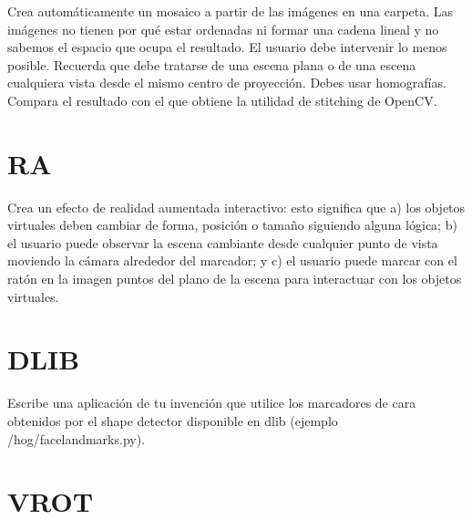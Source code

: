 \documentclass[a4paper]{article} %
\begin{document}
\begin{tcolorbox}[breakable,notitle,boxrule=0pt,colback=lightgray,colframe=lightgray]
	Crea automáticamente un mosaico a partir de las imágenes en una carpeta. Las imágenes no tienen por qué estar ordenadas ni formar una cadena lineal y no sabemos el espacio que ocupa el resultado. El usuario debe intervenir lo menos posible. Recuerda que debe tratarse de una escena plana o de una escena cualquiera vista desde el mismo centro de proyección. Debes usar homografías. Compara el resultado con el que obtiene la utilidad de stitching de OpenCV.
\end{tcolorbox}

\newpage


\section{RA}
\bigskip

\begin{tcolorbox}[breakable,notitle,boxrule=0pt,colback=lightgray,colframe=lightgray]
	Crea un efecto de realidad aumentada interactivo: esto significa que a) los objetos virtuales deben cambiar de forma, posición o tamaño siguiendo alguna lógica; b) el usuario puede observar la escena cambiante desde cualquier punto de vista moviendo la cámara alrededor del marcador; y c) el usuario puede marcar con el ratón en la imagen puntos del plano de la escena para interactuar con los objetos virtuales.
\end{tcolorbox}

\newpage


\section{DLIB}
\bigskip

\begin{tcolorbox}[breakable,notitle,boxrule=0pt,colback=lightgray,colframe=lightgray]
	Escribe una aplicación de tu invención que utilice los marcadores de cara obtenidos por el shape detector disponible en dlib (ejemplo /hog/facelandmarks.py).
\end{tcolorbox}

\newpage


\section{VROT}
\bigskip
\end{document}
